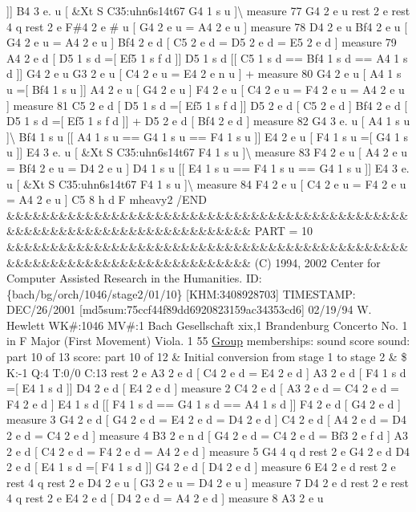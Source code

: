 \mbox{]}\mbox{]} B4 3 e. u \mbox{[} \&Xt S C35\+:uhn6s14t67 G4 1 s u \mbox{]}\textbackslash{} measure 77 G4 2 e u rest 2 e rest 4 q rest 2 e F\#4 2 e \# u \mbox{[} G4 2 e u = A4 2 e u \mbox{]} measure 78 D4 2 e u Bf4 2 e u \mbox{[} G4 2 e u = A4 2 e u \mbox{]} Bf4 2 e d \mbox{[} C5 2 e d = D5 2 e d = E5 2 e d \mbox{]} measure 79 A4 2 e d \mbox{[} D5 1 s d =\mbox{[} Ef5 1 s f d \mbox{]}\mbox{]} D5 1 s d \mbox{[}\mbox{[} C5 1 s d == Bf4 1 s d == A4 1 s d \mbox{]}\mbox{]} G4 2 e u G3 2 e u \mbox{[} C4 2 e u = E4 2 e n u \mbox{]} + measure 80 G4 2 e u \mbox{[} A4 1 s u =\mbox{[} Bf4 1 s u \mbox{]}\mbox{]} A4 2 e u \mbox{[} G4 2 e u \mbox{]} F4 2 e u \mbox{[} C4 2 e u = F4 2 e u = A4 2 e u \mbox{]} measure 81 C5 2 e d \mbox{[} D5 1 s d =\mbox{[} Ef5 1 s f d \mbox{]}\mbox{]} D5 2 e d \mbox{[} C5 2 e d \mbox{]} Bf4 2 e d \mbox{[} D5 1 s d =\mbox{[} Ef5 1 s f d \mbox{]}\mbox{]} + D5 2 e d \mbox{[} Bf4 2 e d \mbox{]} measure 82 G4 3 e. u \mbox{[} A4 1 s u \mbox{]}\textbackslash{} Bf4 1 s u \mbox{[}\mbox{[} A4 1 s u == G4 1 s u == F4 1 s u \mbox{]}\mbox{]} E4 2 e u \mbox{[} F4 1 s u =\mbox{[} G4 1 s u \mbox{]}\mbox{]} E4 3 e. u \mbox{[} \&Xt S C35\+:uhn6s14t67 F4 1 s u \mbox{]}\textbackslash{} measure 83 F4 2 e u \mbox{[} A4 2 e u = Bf4 2 e u = D4 2 e u \mbox{]} D4 1 s u \mbox{[}\mbox{[} E4 1 s u == F4 1 s u == G4 1 s u \mbox{]}\mbox{]} E4 3 e. u \mbox{[} \&Xt S C35\+:uhn6s14t67 F4 1 s u \mbox{]}\textbackslash{} measure 84 F4 2 e u \mbox{[} C4 2 e u = F4 2 e u = A4 2 e u \mbox{]} C5 8 h d F mheavy2 /\+E\+ND \&\&\&\&\&\&\&\&\&\&\&\&\&\&\&\&\&\&\&\&\&\&\&\&\&\&\&\&\&\&\&\&\&\&\&\&\&\&\&\&\&\&\&\&\&\&\&\&\&\&\&\&\&\&\&\&\&\&\&\&\&\&\&\&\&\&\&\&\&\&\&\&\&\& P\+A\+RT = 10 \&\&\&\&\&\&\&\&\&\&\&\&\&\&\&\&\&\&\&\&\&\&\&\&\&\&\&\&\&\&\&\&\&\&\&\&\&\&\&\&\&\&\&\&\&\&\&\&\&\&\&\&\&\&\&\&\&\&\&\&\&\&\&\&\&\&\&\&\&\&\&\&\&\& (C) 1994, 2002 Center for Computer Assisted Research in the Humanities. ID\+: \{bach/bg/orch/1046/stage2/01/10\} \mbox{[}K\+HM\+:3408928703\mbox{]} T\+I\+M\+E\+S\+T\+A\+MP\+: D\+E\+C/26/2001 \mbox{[}md5sum\+:75ccf44f89dd6920823159ac34353cd6\mbox{]} 02/19/94 W. Hewlett WK\#\+:1046 MV\#\+:1 Bach Gesellschaft xix,1 Brandenburg Concerto No. 1 in F Major (First Movement) Viola. 1 55 \hyperlink{class_group}{Group} memberships\+: sound score sound\+: part 10 of 13 score\+: part 10 of 12 \& Initial conversion from stage 1 to stage 2 \& \$ K\+:-\/1 Q\+:4 T\+:0/0 C\+:13 rest 2 e A3 2 e d \mbox{[} C4 2 e d = E4 2 e d \mbox{]} A3 2 e d \mbox{[} F4 1 s d =\mbox{[} E4 1 s d \mbox{]}\mbox{]} D4 2 e d \mbox{[} E4 2 e d \mbox{]} measure 2 C4 2 e d \mbox{[} A3 2 e d = C4 2 e d = F4 2 e d \mbox{]} E4 1 s d \mbox{[}\mbox{[} F4 1 s d == G4 1 s d == A4 1 s d \mbox{]}\mbox{]} F4 2 e d \mbox{[} G4 2 e d \mbox{]} measure 3 G4 2 e d \mbox{[} G4 2 e d = E4 2 e d = D4 2 e d \mbox{]} C4 2 e d \mbox{[} A4 2 e d = D4 2 e d = C4 2 e d \mbox{]} measure 4 B3 2 e n d \mbox{[} G4 2 e d = C4 2 e d = Bf3 2 e f d \mbox{]} A3 2 e d \mbox{[} C4 2 e d = F4 2 e d = A4 2 e d \mbox{]} measure 5 G4 4 q d rest 2 e G4 2 e d D4 2 e d \mbox{[} E4 1 s d =\mbox{[} F4 1 s d \mbox{]}\mbox{]} G4 2 e d \mbox{[} D4 2 e d \mbox{]} measure 6 E4 2 e d rest 2 e rest 4 q rest 2 e D4 2 e u \mbox{[} G3 2 e u = D4 2 e u \mbox{]} measure 7 D4 2 e d rest 2 e rest 4 q rest 2 e E4 2 e d \mbox{[} D4 2 e d = A4 2 e d \mbox{]} measure 8 A3 2 e u 